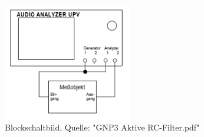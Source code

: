 \begin{figure}[H]
    \begin{center}
        \includegraphics[width=0.5\textwidth]{img/Blockschalt.PNG}
        \caption{Blockschaltbild, Quelle: "GNP3 Aktive RC-Filter.pdf" }
        \label{fig:A2_label}
    \end{center}
\end{figure}

